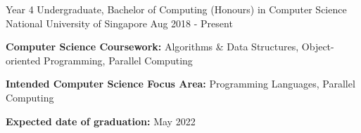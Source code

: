 

\begin{cventries}

  \cventry
    {Year 4 Undergraduate, Bachelor of Computing (Honours) in Computer Science} %
    {National University of Singapore} %
    {} %
    {Aug 2018 - Present} %
    {
      \begin{cvitems} %
        \item {\textbf{Computer Science Coursework:} Algorithms \& Data Structures, Object-oriented Programming, Parallel Computing}
        \item {\textbf{Intended Computer Science Focus Area:} Programming Languages, Parallel Computing}
        \item {\textbf{Expected date of graduation:} May 2022}
      \end{cvitems}
    }

\end{cventries}
